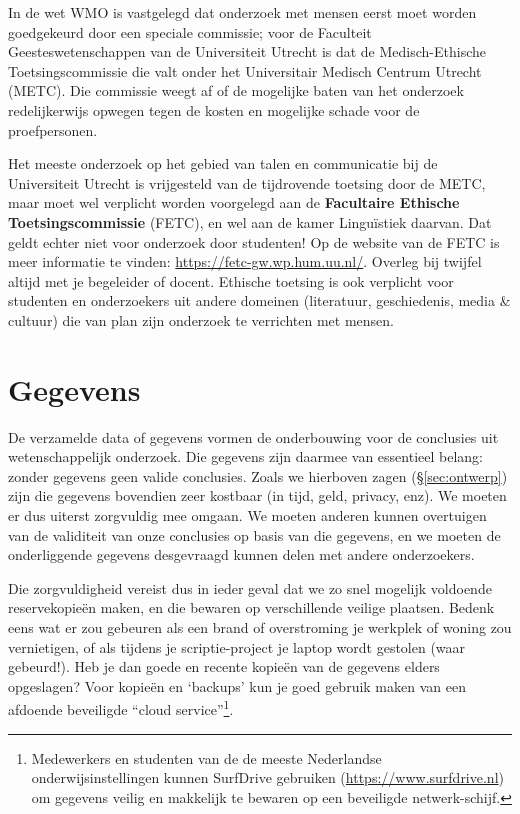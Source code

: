 \documentclass[
]{book}
\begin{document}
In de wet WMO is vastgelegd dat onderzoek met mensen eerst moet worden
goedgekeurd door een speciale commissie; voor de Faculteit
Geesteswetenschappen van de Universiteit Utrecht is dat de
Medisch-Ethische Toetsingscommissie die valt onder het Universitair
Medisch Centrum Utrecht (METC). Die commissie weegt af of de mogelijke
baten van het onderzoek redelijkerwijs opwegen tegen de kosten en
mogelijke schade voor de proefpersonen.

Het meeste onderzoek op het gebied van talen en communicatie bij de
Universiteit Utrecht is vrijgesteld van de tijdrovende toetsing door de
METC, maar moet wel verplicht worden voorgelegd aan de \textbf{Facultaire
Ethische Toetsingscommissie} (FETC), en wel aan de kamer Linguïstiek
daarvan. Dat geldt echter niet voor onderzoek door studenten! Op de website
van de FETC is meer informatie te vinden:
\url{https://fetc-gw.wp.hum.uu.nl/}. Overleg bij twijfel altijd met je begeleider of docent.
Ethische toetsing is ook verplicht voor
studenten en onderzoekers uit andere domeinen (literatuur, geschiedenis,
media \& cultuur) die van plan zijn onderzoek te verrichten met mensen.

\hypertarget{gegevens}{%
\section{Gegevens}\label{gegevens}}

De verzamelde data of gegevens vormen de onderbouwing voor de conclusies
uit wetenschappelijk onderzoek. Die gegevens zijn daarmee van essentieel
belang: zonder gegevens geen valide conclusies. Zoals we hierboven zagen
(§\ref{sec:ontwerp})
zijn die gegevens bovendien zeer kostbaar (in tijd, geld, privacy, enz).
We moeten er dus uiterst zorgvuldig mee omgaan. We moeten anderen kunnen
overtuigen van de validiteit van onze conclusies op basis van die
gegevens, en we moeten de onderliggende gegevens desgevraagd kunnen
delen met andere onderzoekers.

Die zorgvuldigheid vereist dus in ieder geval dat we zo snel mogelijk
voldoende reservekopieën maken, en die bewaren op verschillende veilige
plaatsen. Bedenk eens wat er zou gebeuren als een brand of overstroming
je werkplek of woning zou vernietigen, of als tijdens je scriptie-project je laptop wordt gestolen (waar gebeurd!). Heb je dan goede en
recente kopieën van de gegevens elders opgeslagen? Voor kopieën en
`backups' kun je goed gebruik maken van een afdoende beveiligde ``cloud
service''\footnote{Medewerkers en studenten van de de meeste Nederlandse onderwijsinstellingen kunnen SurfDrive gebruiken (\url{https://www.surfdrive.nl}) om gegevens veilig en makkelijk te bewaren op een beveiligde netwerk-schijf.}.
\end{document}
